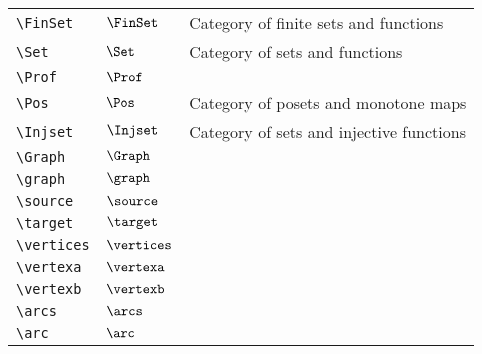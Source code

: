 \begin{longtable}{lll}
  {\color[rgb]{0.5,0.5,0.5}\texttt{\textbackslash FinSet}}                                                  & $\FinSet$                  & Category of finite sets and functions\\
  {\color[rgb]{0.5,0.5,0.5}\texttt{\textbackslash Set}}                                                     & $\Set$                     & Category of sets and functions\\
  {\color[rgb]{0.5,0.5,0.5}\texttt{\textbackslash Prof}}                                                    & $\Prof$                    & \\
  {\color[rgb]{0.5,0.5,0.5}\texttt{\textbackslash Pos}}                                                     & $\Pos$                     & Category of posets and monotone maps\\
  {\color[rgb]{0.5,0.5,0.5}\texttt{\textbackslash Injset}}                                                  & $\Injset$                  & Category of sets and injective functions\\
  {\color[rgb]{0.5,0.5,0.5}\texttt{\textbackslash Graph}}                                                   & $\Graph$                   & \\
  {\color[rgb]{0.5,0.5,0.5}\texttt{\textbackslash graph}}                                                   & $\graph$                   & \\
  {\color[rgb]{0.5,0.5,0.5}\texttt{\textbackslash source}}                                                  & $\source$                  & \\
  {\color[rgb]{0.5,0.5,0.5}\texttt{\textbackslash target}}                                                  & $\target$                  & \\
  {\color[rgb]{0.5,0.5,0.5}\texttt{\textbackslash vertices}}                                                & $\vertices$                & \\
  {\color[rgb]{0.5,0.5,0.5}\texttt{\textbackslash vertexa}}                                                 & $\vertexa$                 & \\
  {\color[rgb]{0.5,0.5,0.5}\texttt{\textbackslash vertexb}}                                                 & $\vertexb$                 & \\
  {\color[rgb]{0.5,0.5,0.5}\texttt{\textbackslash arcs}}                                                    & $\arcs$                    & \\
  {\color[rgb]{0.5,0.5,0.5}\texttt{\textbackslash arc}}                                                     & $\arc$                     & \\

\end{longtable}
